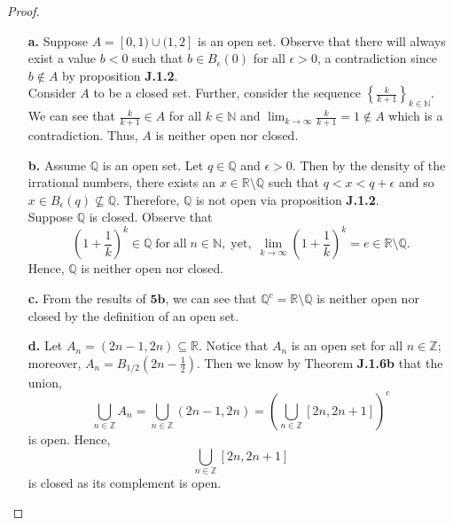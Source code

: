 \documentclass[ 12pt ]{article}
\begin{document}
\begin{enumerate}
		\begin{proof} $ $
			\begin{enumerate}
				\item[\textbf{a.}] Suppose $A = [0, 1) \cup (1, 2]$ is an open set. Observe that there will always exist a value $b < 0$ such that $b \in B_\epsilon( 0 )$ for all
					$\epsilon > 0$, a contradiction since $b \notin A$ by proposition \textbf{J.1.2}. \\

					Consider $A$ to be a closed set. Further, consider the sequence $\left \{ \frac{k}{k + 1} \right \}_{k \in \mathbb{N}}$. We can see that $\frac{k}{k + 1} \in A$ for
					all $k \in \mathbb{N}$ and $\lim_{k \to \infty} \frac{k}{k + 1} = 1 \notin A$ which is a contradiction. Thus, $A$ is neither open nor closed.

				\item[\textbf{b.}] Assume $\mathbb{Q}$ is an open set. Let $q \in \mathbb{Q}$ and $\epsilon > 0$. Then by the density of the irrational numbers, there exists an $x
					\in \mathbb{R} \setminus \mathbb{Q}$ such that $q < x < q + \epsilon$ and so $x \in B_\epsilon(q) \nsubseteq \mathbb{Q}$. Therefore, $\mathbb{Q}$ is not open
					via proposition \textbf{J.1.2}. \\

					Suppose $\mathbb{Q}$ is closed. Observe that $$\left ( 1 + \frac{1}{k} \right )^k \in \mathbb{Q}\; \mathrm{for\; all}\; n \in \mathbb{N},\; \mathrm{yet},\;
					\lim_{k \to \infty} \left ( 1 + \frac{1}{k} \right )^k = e \in \mathbb{R} \setminus \mathbb{Q}.$$ Hence, $\mathbb{Q}$ is neither open nor closed.

				\item[\textbf{c.}] From the results of $\textbf{5b}$, we can see that $\mathbb{Q}^c = \mathbb{R} \setminus \mathbb{Q}$ is neither open nor closed by the definition of
					an open set.

				\item[\textbf{d.}] Let $A_n = (2n - 1, 2n) \subseteq \mathbb{R}$. Notice that $A_n$ is an open set for all $n \in \mathbb{Z}$; moreover, $A_n = B_{1/2}\left ( 2n -
					\frac{1}{2} \right )$. Then we know by Theorem \textbf{J.1.6b} that the union, $$\bigcup_{n \in \mathbb{Z}} A_n = \bigcup_{n \in \mathbb{Z}} (2n - 1, 2n) = \left (
					\bigcup_{n \in \mathbb{Z}} [2n, 2n+1] \right )^c$$ is open. Hence, $$\bigcup_{n \in \mathbb{Z}} [2n, 2n+1]$$ is closed as its complement is open.
			\end{enumerate}
		\end{proof}



\end{enumerate}
\end{document}
